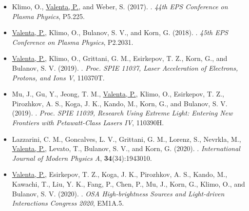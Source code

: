 \documentclass[10pt, a4paper, twoside, openright]{report}
\newcommand{\link}[3][blue]{\href{#2}{\color{#1}{#3}}}%
\begin{document}
\begin{itemize}
	
	\item Klimo, O., \underline{Valenta, P.}, and Weber, S. (2017). \link{http://ocs.ciemat.es/EPS2017PAP/pdf/P5.225.pdf}{Laser absorption and ion acceleration under tight-focusing conditions}. \textit{44th EPS Conference on Plasma Physics}, P5.225.
	
	\item \underline{Valenta, P.}, Klimo, O., Bulanov, S. V., and Korn, G. (2018). \link{http://ocs.ciemat.es/EPS2018PAP/pdf/P2.2031.pdf}{On high-quality electron beam generated by breaking wake wave in near-critical density plasmas}. \textit{45th EPS Conference on Plasma Physics}, P2.2031. 
	
	\item \underline{Valenta, P.}, Klimo, O., Grittani, G. M., Esirkepov, T. Z., Korn, G., and Bulanov, S. V. (2019). \link{https://doi.org/10.1117/12.2521040}{Wakefield excited by ultrashort laser pulses in near-critical density plasmas}. \textit{Proc. SPIE 11037, Laser Acceleration of Electrons, Protons, and Ions V}, 110370T.
	
	\item Mu, J., Gu, Y., Jeong, T. M., \underline{Valenta, P.}, Klimo, O., Esirkepov, T. Z., Pirozhkov, A. S., Koga, J. K., Kando, M., Korn, G., and Bulanov, S. V. (2019). \link{https://doi.org/10.1117/12.2524653}{High order harmonics generation via laser reflection at electron density peaks}. \textit{Proc. SPIE 11039, Research Using Extreme Light: Entering New Frontiers with Petawatt-Class Lasers IV}, 110390H.
	
	\item Lazzarini, C. M., Goncalves, L. V., Grittani, G. M., Lorenz, S., Nevrkla, M., \underline{Valenta, P.}, Levato, T., Bulanov, S. V., and Korn, G. (2020). \link{https://doi.org/10.1142/S0217751X19430103}{Electron acceleration at ELI Beamlines: towards high-energy and high-repetition-rate accelerators}. \textit{International Journal of Modern Physics A}, \textbf{34}(34):1943010.
	
	\item \underline{Valenta, P.}, Esirkepov, T. Z., Koga, J. K., Pirozhkov, A. S., Kando, M., Kawachi, T., Liu, Y. K., Fang, P., Chen, P., Mu, J., Korn, G., Klimo, O., and Bulanov, S. V. (2020). \link{https://doi.org/10.1364/EUVXRAY.2020.EM1A.5}{Relativistic flying mirrors as a compact source of coherent short-wavelength radiation}. \textit{OSA High-brightness Sources and Light-driven Interactions Congress 2020}, EM1A.5.
	

\end{itemize}
\end{document}
